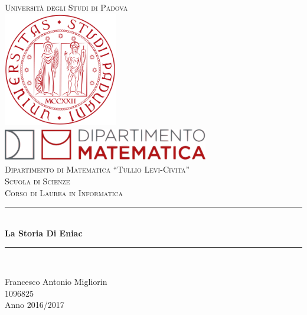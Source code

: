 \begin{titlepage}

    \newcommand{\HRule}{\rule{\linewidth}{0.5mm}}

    \center

    \textsc{\LARGE Università degli Studi di Padova}\\[1cm]

    \includegraphics[height=5cm]{img/UniPd.png}\\[1cm]

    \includegraphics[height=1.5cm, width = 9cm]{img/MathDip.png}\\
    \textsc{Dipartimento di Matematica ``Tullio Levi-Civita''}\\[1.2cm]
    \textsc{\Large Scuola di Scienze}\\[0.5cm]

    \textsc{\large Corso di Laurea in Informatica}\\[0.5cm]

    \vspace{2.5cm}


    \HRule \\[0.4cm]
    { \huge \bfseries La Storia Di Eniac}\\[0.4cm]
    \HRule \\[1.5cm]


    \vspace{2.5cm}


    {\large
        Francesco Antonio Migliorin \\
        1096825 \\
        Anno 2016/2017}\\[2cm]


    \vfill

\end{titlepage}